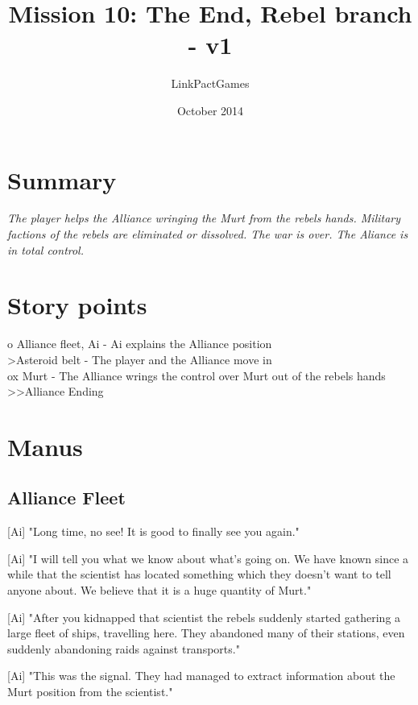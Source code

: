 \documentclass[a4paper,12pt]{article}
\begin{document}
\title{Mission 10: The End, Rebel branch - v1}
\author{LinkPactGames}
\date{October 2014}
\maketitle

\section{Summary}

\textit{The player helps the Alliance wringing the Murt from the rebels hands. Military factions
of the rebels are eliminated or dissolved. The war is over. The Aliance is in total control.}

\section{Story points}

o Alliance fleet, Ai - Ai explains the Alliance position\\
\textgreater Asteroid belt - The player and the Alliance move in\\
ox Murt - The Alliance wrings the control over Murt out of the rebels hands\\
\textgreater \textgreater Alliance Ending

\section{Manus}

\subsection{Alliance Fleet}

[Ai] "Long time, no see! It is good to finally see you again."

[Ai] "I will tell you what we know about what's going on. We have known since a while that the scientist has located
something which they doesn't want to tell anyone about. We believe that it is a huge quantity of Murt."

[Ai] "After you kidnapped that scientist the rebels suddenly started gathering a large fleet of ships, travelling here.
They abandoned many of their stations, even suddenly abandoning raids against transports."

[Ai] "This was the signal. They had managed to extract information about the Murt position from the scientist."
\end{document}

